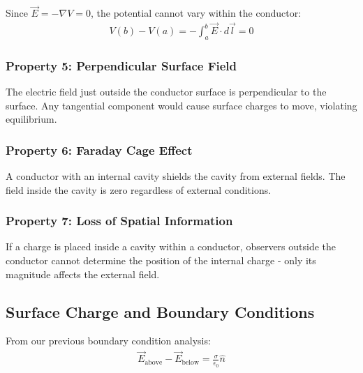 \documentclass{article}
\begin{document}
Since $\vec{E} = -\nabla V = 0$, the potential cannot vary within the conductor:
\begin{align*}
    V(b) - V(a) = -\int_a^b \vec{E} \cdot d\vec{l} = 0
\end{align*}

\subsubsection{Property 5: Perpendicular Surface Field}
The electric field just outside the conductor surface is perpendicular to the surface. Any tangential component would cause surface charges to move, violating equilibrium.

\begin{center}
\end{center}

\subsubsection{Property 6: Faraday Cage Effect}
A conductor with an internal cavity shields the cavity from external fields. The field inside the cavity is zero regardless of external conditions.

\subsubsection{Property 7: Loss of Spatial Information}
If a charge is placed inside a cavity within a conductor, observers outside the conductor cannot determine the position of the internal charge - only its magnitude affects the external field.

\subsection{Surface Charge and Boundary Conditions}
From our previous boundary condition analysis:
\begin{align*}
    \vec{E}_{\text{above}} - \vec{E}_{\text{below}} = \frac{\sigma}{\epsilon_0}\hat{n}
\end{align*}
\end{document}
